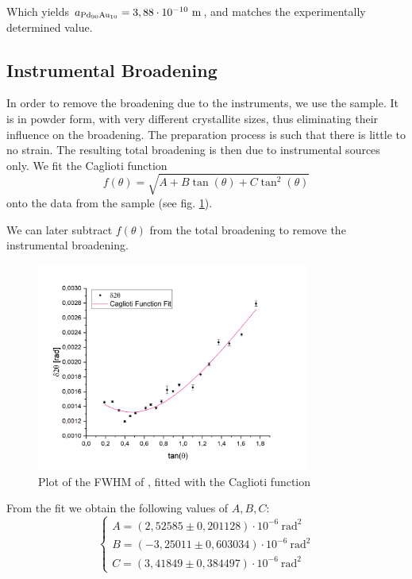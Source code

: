 \documentclass[12pt]{article}
\begin{document}
Which yields $a_{\ce{Pd90Au10}} = 3,88 \cdot 10^{-10} \ \text{m}$, and matches the experimentally determined value. \\

\subsection{Instrumental Broadening}
In order to remove the broadening due to the instruments, we use the  sample. It is in powder form, with very different crystallite sizes, thus eliminating their influence on the broadening. The preparation process is such that there is little to no strain. The resulting total broadening is then due to instrumental sources only.
We fit the Caglioti function 
\begin{equation}
    f(\theta) = \sqrt{A + B \tan(\theta) + C \tan^2(\theta)}
\end{equation}
onto the data from the  sample (see fig. \ref{fig:CagliotiFit}).

We can later subtract $f(\theta)$ from the total broadening to remove the instrumental broadening.

\begin{figure}[!ht]
    \centering
    \includegraphics[width=0.8\textwidth]{2_XRD/Graphics/Experiments/Instrumental Broadening/CagliotiFit.png}
    \caption{Plot of the FWHM of , fitted with the Caglioti function}
    \label{fig:CagliotiFit}
\end{figure}
\FloatBarrier

From the fit we obtain the following values of $A,B,C$:
\[ 
\begin{cases}
    A = ( 2,52585 \pm 0,201128 ) \cdot 10^{-6} \ \text{rad}^2 \\
    B = (-3,25011 \pm 0,603034 ) \cdot 10^{-6} \ \text{rad}^2 \\
    C = ( 3,41849 \pm 0,384497 ) \cdot 10^{-6} \ \text{rad}^2
\end{cases}
\]
\end{document}
